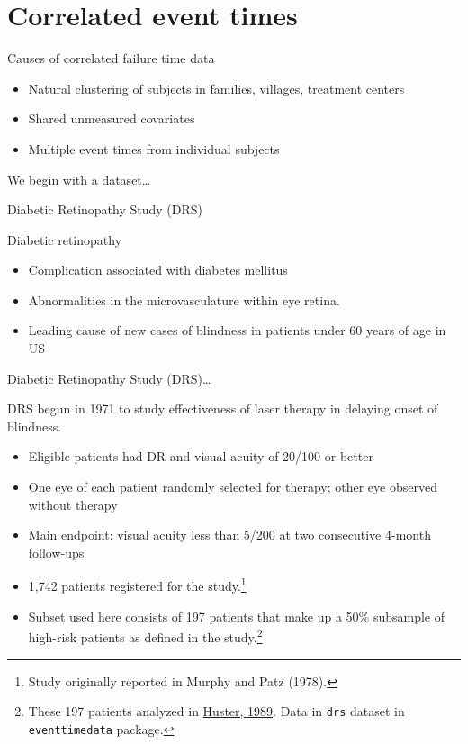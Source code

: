 \documentclass[ignorenonframetext,]{beamer}
\begin{document}
\hypertarget{correlated-event-times}{%
\section{Correlated event times}\label{correlated-event-times}}

\begin{frame}{%
\protect\hypertarget{causes-of-correlated-failure-time-data}{%
Causes of correlated failure time data}}

\begin{itemize}
\item
  Natural clustering of subjects in families, villages, treatment
  centers
\item
  Shared unmeasured covariates
\item
  Multiple event times from individual subjects
\end{itemize}

We begin with a dataset\ldots{}

\end{frame}

\begin{frame}{%
\protect\hypertarget{diabetic-retinopathy-study-drs}{%
Diabetic Retinopathy Study (DRS)}}

Diabetic retinopathy

\begin{itemize}
\item
  Complication associated with diabetes mellitus
\item
  Abnormalities in the microvasculature within eye retina.
\item
  Leading cause of new cases of blindness in patients under 60 years of
  age in US
\end{itemize}

\end{frame}

\begin{frame}{%
\protect\hypertarget{diabetic-retinopathy-study-drs-1}{%
Diabetic Retinopathy Study (DRS)\ldots}}

DRS begun in 1971 to study effectiveness of laser therapy in delaying
onset of blindness.

\begin{itemize}
\item
  Eligible patients had DR and visual acuity of 20/100 or better
\item
  One eye of each patient randomly selected for therapy; other eye
  observed without therapy
\item
  Main endpoint: visual acuity less than 5/200 at two consecutive
  4-month follow-ups
\item
  1,742 patients registered for the
  study.\footnote{Study originally reported in Murphy and Patz (1978).}
\item
  Subset used here consists of 197 patients that make up a 50\%
  subsample of high-risk patients as defined in the
  study.\footnote{These 197 patients analyzed in \href{run:../../methods_papers/Huster\_drs.pdf}{Huster, 1989}. Data in \texttt{drs} dataset in \texttt{eventtimedata} package.}
\end{itemize}

\end{frame}
\end{document}
